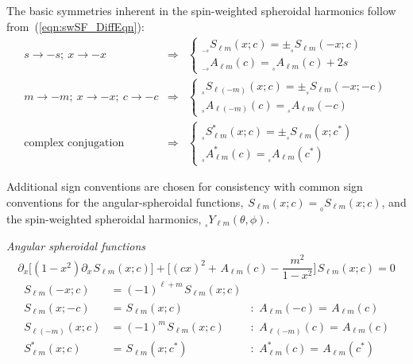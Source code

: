 \documentclass[11pt]{article}
\newcommand{\swY}[4][]{{}_{{}_{#2}}\!Y^{#1}_{#3}(#4)}
\newcommand{\swS}[5][]{{}_{{}_{#2}}S^{#1}_{#3}(#4;#5)}
\newcommand{\scA}[4][]{{}_{{}_{#2}}A^{#1}_{#3}(#4)}
\begin{document}
The basic symmetries inherent in the spin-weighted spheroidal harmonics
follow from~(\ref{eqn:swSF_DiffEqn}):
\begin{eqnarray}
s\rightarrow-s;\ x\rightarrow-x &\Rightarrow&
    \left\{\begin{array}{c}\swS{-s}{\ell{m}}{x}{c}=\pm\swS{s}{\ell{m}}{-x}{c} \\
        \scA{-s}{\ell{m}}{c} = \scA{s}{\ell{m}}{c} + 2s \end{array}\right. \\
m\rightarrow-m;\ x\rightarrow-x;\ c\rightarrow-c &\Rightarrow&
    \left\{\begin{array}{c}\swS{s}{\ell(-m)}{x}{c}=\pm\swS{s}{\ell{m}}{-x}{-c}\\
        \scA{s}{\ell(-m)}{c} = \scA{s}{\ell{m}}{-c} \end{array}\right. \\
\mbox{complex conjugation} &\Rightarrow&
    \left\{\begin{array}{c} \swS[*]{s}{\ell{m}}{x}{c}=\pm\swS{s}{\ell{m}}{x}{c^*} \\
        \scA[*]{s}{\ell{m}}{c} = \scA{s}{\ell{m}}{c^*} \end{array}\right.
\end{eqnarray}

Additional sign conventions are chosen for consistency with common
sign conventions for the angular-spheroidal functions,
$\swS{}{\ell{m}}{x}{c} = \swS{0}{\ell{m}}{x}{c}$, and the spin-weighted spheroidal harmonics, $\swY{s}{\ell{m}}{\theta,\phi}$.

\vspace{0.25in}
\noindent
{\it Angular spheroidal functions}
\begin{equation}
\partial_x \Big[ (1-x^2)\partial_x \swS{}{\ell{m}}{x}{c}\Big] + \bigg[(cx)^2 + \scA{}{\ell{m}}{c} - \frac{m^2}{1-x^2}\bigg]\swS{}{\ell{m}}{x}{c} = 0
\end{equation}
\begin{align}
\swS{}{\ell{m}}{-x}{c} &= (-1)^{\ell+m}\swS{}{\ell{m}}{x}{c}& \\
\swS{}{\ell{m}}{x}{-c} &= \swS{}{\ell{m}}{x}{c} 
           &:\ \scA{}{\ell{m}}{-c} = \scA{}{\ell{m}}{c} \\
\swS{}{\ell(-m)}{x}{c} &= (-1)^m\swS{}{\ell{m}}{x}{c} 
           &:\ \scA{}{\ell(-m)}{c} = \scA{}{\ell{m}}{c} \\
\swS[*]{}{\ell{m}}{x}{c} &= \swS{}{\ell{m}}{x}{c^*} 
           &:\ \scA[*]{}{\ell{m}}{c} = \scA{}{\ell{m}}{c^*}
\end{align}
\end{document}
